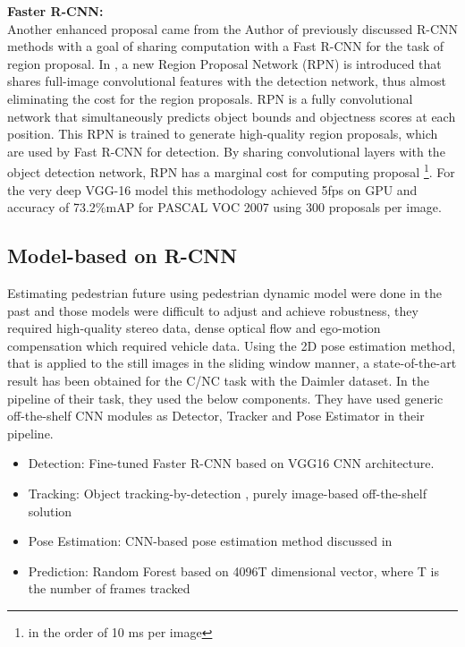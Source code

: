 \newpara \textbf{Faster R-CNN:} \\  
Another enhanced proposal came from the Author of previously discussed R-CNN methods with a goal of sharing computation with a Fast R-CNN for the task of region proposal. In \cite{ren2015faster}, a new Region Proposal Network (RPN) is introduced that shares full-image convolutional features with the detection network, thus almost eliminating the cost for the region proposals. RPN is a fully convolutional network that simultaneously predicts object bounds and objectness scores at each position. This RPN is trained to generate high-quality region proposals, which are used by Fast R-CNN for detection. By sharing convolutional layers with the object detection network, RPN has a marginal cost for computing proposal \footnote{in the order of 10 ms per image}. For the very deep VGG-16 model this methodology achieved 5fps on GPU and accuracy of 73.2\%mAP for PASCAL VOC 2007 using 300 proposals per image. 

\subsection{Model-based on R-CNN}
\newpara Estimating pedestrian future using pedestrian dynamic model were done in the past and those models were difficult to adjust and achieve robustness, they required high-quality stereo data, dense optical flow and ego-motion compensation which required vehicle data.  Using the 2D pose estimation method, that is applied to the still images in the sliding window manner, a state-of-the-art result has been obtained\cite{fang2018pedestrian} for the C/NC task with the Daimler dataset. In the pipeline of their task, they used the below components. They have used generic off-the-shelf CNN modules as Detector, Tracker and Pose Estimator in their pipeline.

\begin{itemize}
	\item Detection: Fine-tuned Faster R-CNN \cite{ren2015faster} based on VGG16 CNN architecture. 
	\item Tracking: Object tracking-by-detection \cite{wojke2017simple}, purely image-based off-the-shelf solution 
	\item Pose Estimation: CNN-based pose estimation method discussed in \cite{cao2017realtime}
	\item Prediction: Random Forest based on 4096T dimensional vector, where T is the number of frames tracked
\end{itemize}

